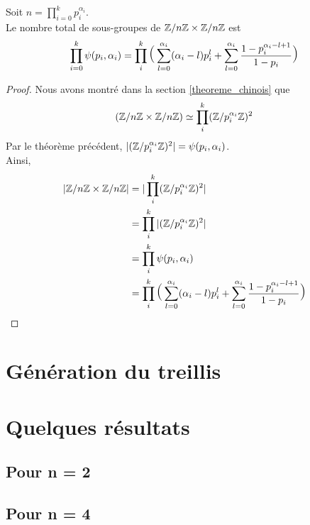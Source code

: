 \documentclass[12pt]{article}
\newcommand{\ZnZ}{\Z/n\Z}
\newcommand{\ZZ}{\ZnZ \x \ZnZ}
\begin{document}
\begin{proposition}
	Soit $n = \prod\limits_{i = 0}^k p_i^{\alpha_i}$.\\
	Le nombre total de sous-groupes de $\ZZ$ est
	$$\prod_{i = 0}^{k} \psi(p_i,\alpha_i)
		= \prod_i^k\mlarge[3](\sum_{l=0}^{\alpha_i}(\alpha_i-l)p_i^l +%
		\sum_{l = 0}^{\alpha_i}\frac{1- p_i^{\alpha_i-l+1}}{1 - p_i}\mlarge[3])$$
\end{proposition}

\begin{proof}
	Nous avons montré dans la section \ref{theoreme_chinois} que
	$$(\ZZ) \isom \prod_i^k(\Z/p_i^{\alpha_i}\Z)^2$$
	Par le théorème précédent, $|(\mathbb Z/p_i^{\alpha_i}\mathbb Z)^2| = \psi(p_i, \alpha_i)$.\\
	Ainsi,
	\begin{equation*}
		\begin{split}
			|\ZZ| &= |\prod_i^k(\Z/p_i^{\alpha_i}\Z)^2|\\
			&= \prod_i^k|(\Z/p_i^{\alpha_i}\Z)^2|\\
			&= \prod_i^k\psi(p_i,\alpha_i)\\
			&= \prod_i^k\mlarge[3](\sum_{l=0}^{\alpha_i}(\alpha_i-l)p_i^l +%
			\sum_{l = 0}^{\alpha_i}\frac{1- p_i^{\alpha_i-l+1}}{1 - p_i}\mlarge[3])
		\end{split}
	\end{equation*}
\end{proof}
\newpage
\section{Génération du treillis}

\newpage
\section{Quelques résultats}
\subsection{Pour n = 2}
\subsection{Pour n = 4}
\end{document}
